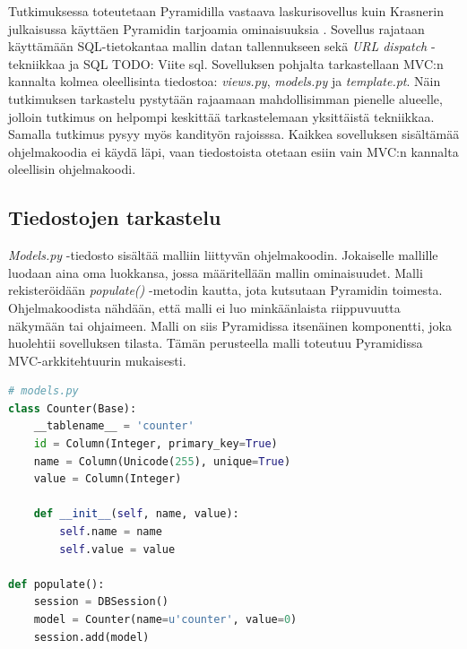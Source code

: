 \documentclass[finnish,utf8,nonumbib,palatino,kandi]{gradu2}
\begin{document}
Tutkimuksessa toteutetaan Pyramidilla vastaava laskurisovellus kuin Krasnerin julkaisussa käyttäen Pyramidin tarjoamia ominaisuuksia \cite{Krasner:desc}. Sovellus rajataan käyttämään SQL-tietokantaa mallin datan tallennukseen sekä \emph{URL dispatch} -tekniikkaa \cite{urldispatch} ja SQL TODO: Viite sql. Sovelluksen pohjalta tarkastellaan MVC:n kannalta kolmea oleellisinta tiedostoa: \emph{views.py}, \emph{models.py} ja \emph{template.pt}. Näin tutkimuksen tarkastelu pystytään rajaamaan mahdollisimman pienelle alueelle, jolloin tutkimus on helpompi keskittää tarkastelemaan yksittäistä tekniikkaa. Samalla tutkimus pysyy myös kandityön rajoisssa. Kaikkea sovelluksen sisältämää ohjelmakoodia ei käydä läpi, vaan tiedostoista otetaan esiin vain MVC:n kannalta oleellisin ohjelmakoodi. 


\subsection{Tiedostojen tarkastelu}

\emph{Models.py} -tiedosto sisältää malliin liittyvän ohjelmakoodin. Jokaiselle mallille luodaan aina oma luokkansa, jossa määritellään mallin ominaisuudet. Malli rekisteröidään \emph{populate()} -metodin kautta, jota kutsutaan Pyramidin toimesta.
Ohjelmakoodista nähdään, että malli ei luo minkäänlaista riippuvuutta näkymään tai ohjaimeen. Malli on siis Pyramidissa itsenäinen komponentti, joka huolehtii sovelluksen tilasta. Tämän perusteella malli toteutuu Pyramidissa MVC-arkkitehtuurin mukaisesti.
\begin{lstlisting}[language=Python]
# models.py
class Counter(Base):
    __tablename__ = 'counter'
    id = Column(Integer, primary_key=True)
    name = Column(Unicode(255), unique=True)
    value = Column(Integer)

    def __init__(self, name, value):
        self.name = name
        self.value = value

def populate():
    session = DBSession()
    model = Counter(name=u'counter', value=0)
    session.add(model)
\end{lstlisting} 
\end{document}
